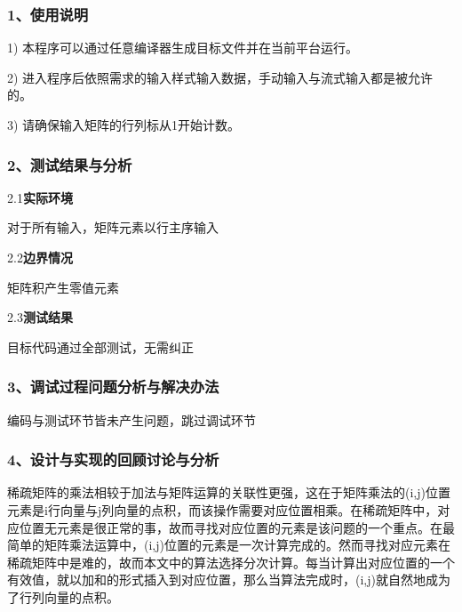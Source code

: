 \documentclass[UTF8, a4paper]{ctexart}
\begin{document}
\subsubsection*{1、使用说明}
1) 本程序可以通过任意编译器生成目标文件并在当前平台运行。 \par
2) 进入程序后依照需求的输入样式输入数据，手动输入与流式输入都是被允许的。 \par
3) 请确保输入矩阵的行列标从1开始计数。 \par
\subsubsection*{2、测试结果与分析}
2.1\;\textbf{实际环境} \par
对于所有输入，矩阵元素以行主序输入\par
2.2\;\textbf{边界情况} \par
矩阵积产生零值元素 \par
2.3\;\textbf{测试结果} \par
目标代码通过全部测试，无需纠正
\subsubsection*{3、调试过程问题分析与解决办法}
编码与测试环节皆未产生问题，跳过调试环节
\subsubsection*{4、设计与实现的回顾讨论与分析}
稀疏矩阵的乘法相较于加法与矩阵运算的关联性更强，这在于矩阵乘法的(i,j)位置元素是i行向量与j列向量的点积，而该操作需要对应位置相乘。在稀疏矩阵中，对应位置无元素是很正常的事，故而寻找对应位置的元素是该问题的一个重点。在最简单的矩阵乘法运算中，(i,j)位置的元素是一次计算完成的。然而寻找对应元素在稀疏矩阵中是难的，故而本文中的算法选择分次计算。每当计算出对应位置的一个有效值，就以加和的形式插入到对应位置，那么当算法完成时，(i,j)就自然地成为了行列向量的点积。
\end{document}
